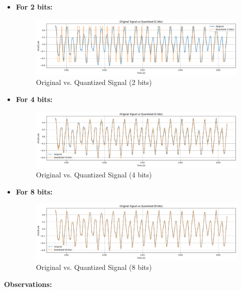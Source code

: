 \documentclass[10pt]{article}
\theoremstyle{definition}
\theoremstyle{remark}
\theoremstyle{definition}
\numberwithin{equation}{prob}
\begin{document}
\begin{itemize}
    \item \textbf{For 2 bits:}

    \begin{figure}[H]
    \centering
    \includegraphics[width=1\textwidth]{./figures/original_vs_quantized_2bits.png}
    \caption{Original vs. Quantized Signal (2 bits)}
    \end{figure}

    \item \textbf{For 4 bits:}

    \begin{figure}[H]
    \centering
    \includegraphics[width=1\textwidth]{./figures/original_vs_quantized_4bits.png}
    \caption{Original vs. Quantized Signal (4 bits)}
    \end{figure}

    \item \textbf{For 8 bits:}

    \begin{figure}[H]
    \centering
    \includegraphics[width=1\textwidth]{./figures/original_vs_quantized_8bits.png}
    \caption{Original vs. Quantized Signal (8 bits)}
    \end{figure}
\end{itemize}

\textbf{Observations:}
\end{document}
